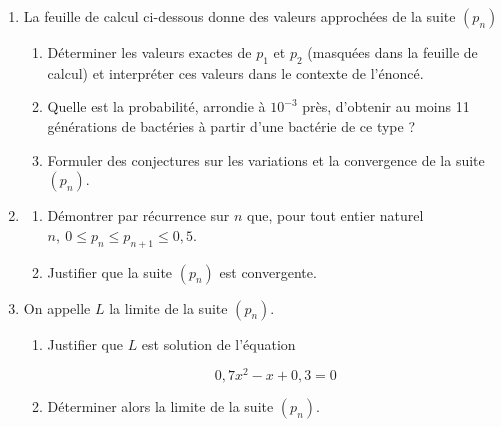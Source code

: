 \documentclass[10pt]{article}
\begin{document}
\begin{minipage}{0.68\linewidth}
\begin{enumerate}
\item La feuille de calcul ci-dessous donne des valeurs approchées de la suite $\left(p_n\right)$
	\begin{enumerate}
		\item Déterminer les valeurs exactes de $p_1$ et $p_2$ (masquées dans la feuille de calcul) et interpréter ces valeurs dans le contexte de l'énoncé.
		\item Quelle est la probabilité, arrondie à $10^{-3}$ près, d'obtenir au moins 11 générations de bactéries à partir d'une bactérie de ce type ?
		\item Formuler des conjectures sur les variations et la convergence de la suite $\left(p_n\right)$.
	\end{enumerate}
\item 
	\begin{enumerate}
		\item Démontrer par récurrence sur $n$ que,
pour tout entier naturel $n,\: 0 \leqslant p_n \leqslant p_{n+1} \leqslant0,5$.
		\item Justifier que la suite $\left(p_n\right)$ est convergente.
	\end{enumerate}
\item On appelle $L$ la limite de la suite $\left(p_n\right)$.
	\begin{enumerate}
		\item Justifier que $L$ est solution de l'équation 
		
		\[0,7x^2 - x  + 0,3 = 0\]
		\item Déterminer alors la limite de la suite $\left(p_n\right)$.
	\end{enumerate}
\end{enumerate}
\end{minipage}\hfill
\end{document}
